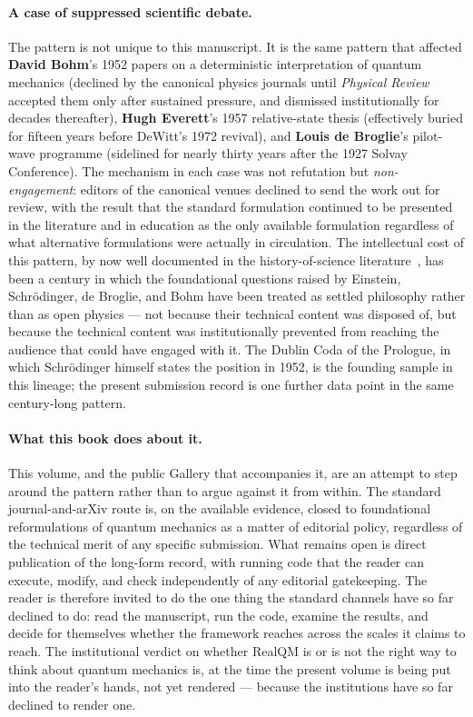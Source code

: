 \paragraph{A case of suppressed scientific debate.}
The pattern is not unique to this manuscript. It is the same pattern that affected \textbf{David Bohm}'s 1952 papers on a deterministic interpretation of quantum mechanics (declined by the canonical physics journals until \emph{Physical Review} accepted them only after sustained pressure, and dismissed institutionally for decades thereafter), \textbf{Hugh Everett}'s 1957 relative-state thesis (effectively buried for fifteen years before DeWitt's 1972 revival), and \textbf{Louis de Broglie}'s pilot-wave programme (sidelined for nearly thirty years after the 1927 Solvay Conference). The mechanism in each case was not refutation but \emph{non-engagement}: editors of the canonical venues declined to send the work out for review, with the result that the standard formulation continued to be presented in the literature and in education as the only available formulation regardless of what alternative formulations were actually in circulation. The intellectual cost of this pattern, by now well documented in the history-of-science literature~\cite{Cushing94, Freire15, Beller99}, has been a century in which the foundational questions raised by Einstein, Schr\"odinger, de Broglie, and Bohm have been treated as settled philosophy rather than as open physics --- not because their technical content was disposed of, but because the technical content was institutionally prevented from reaching the audience that could have engaged with it. The Dublin Coda of the Prologue, in which Schr\"odinger himself states the position in 1952, is the founding sample in this lineage; the present submission record is one further data point in the same century-long pattern.

\paragraph{What this book does about it.}
This volume, and the public Gallery that accompanies it, are an attempt to step around the pattern rather than to argue against it from within. The standard journal-and-arXiv route is, on the available evidence, closed to foundational reformulations of quantum mechanics as a matter of editorial policy, regardless of the technical merit of any specific submission. What remains open is direct publication of the long-form record, with running code that the reader can execute, modify, and check independently of any editorial gatekeeping. The reader is therefore invited to do the one thing the standard channels have so far declined to do: read the manuscript, run the code, examine the results, and decide for themselves whether the framework reaches across the scales it claims to reach. The institutional verdict on whether RealQM is or is not the right way to think about quantum mechanics is, at the time the present volume is being put into the reader's hands, not yet rendered --- because the institutions have so far declined to render one.

